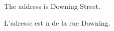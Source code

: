 \documentclass{article}
\begin{document}
The address is  Downing Street. %
\begin{french}
L'adresse est n de la rue Downing. %
\end{french}
\end{document}
